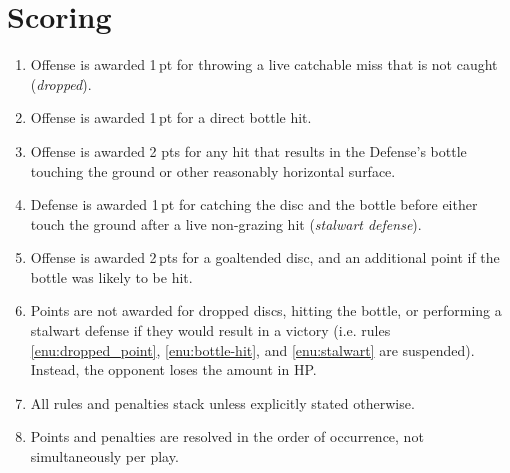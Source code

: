 \documentclass[11pt,letterpaper,twocolumn,english,DIV=calc]{scrartcl}
\begin{document}
\section{Scoring}
\begin{enumerate}
	\item \label{enu:dropped_point}Offense is awarded 1\,pt for throwing a live catchable miss that is not caught (\emph{dropped}).
	\item \label{enu:bottle-hit}Offense is awarded 1\,pt for a direct bottle hit.
	\item Offense is awarded 2 pts for any hit that results in the Defense's bottle touching the ground or other reasonably horizontal surface.
	\item \label{enu:stalwart}Defense is awarded 1\,pt for catching the disc and the bottle before either touch the ground after a live non-grazing hit (\emph{stalwart defense}). 
	\item Offense is awarded 2\,pts for a goaltended disc, and an additional point if the bottle was likely to be hit.
	\item Points are not awarded for dropped discs, hitting the bottle, or performing a stalwart defense if they would result in a victory (i.e. rules \ref{enu:dropped_point}, \ref{enu:bottle-hit}, and \ref{enu:stalwart} are suspended). Instead, the opponent loses the amount in HP.

	\item All rules and penalties stack unless explicitly stated otherwise.
	\item Points and penalties are resolved in the order of occurrence, not simultaneously per play.
\end{enumerate}
\end{document}
